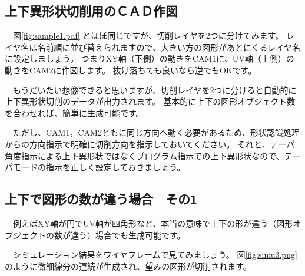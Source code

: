 

\subsection{上下異形状切削用のＣＡＤ作図}
　図\ref{fig:sample1.pdf} とほぼ同じですが、切削レイヤを2つに分けてみます。
レイヤ名は名前順に並び替えられますので、大きい方の図形があとにくるレイヤ名に設定しましょう。
つまりXY軸（下側）の動きをCAM1に、UV軸（上側）の動きをCAM2に作図します。
抜け落ちても良いなら逆でもOKです。


　もうだいたい想像できると思いますが、切削レイヤを2つに分けると自動的に上下異形状切削のデータが出力されます。
基本的に上下の図形オブジェクト数を合わせれば、簡単に生成可能です。


　ただし、CAM1，CAM2ともに同じ方向へ動く必要があるため、形状認識処理からの方向指示で明確に切削方向を指示しておいてください。
それと、テーパ角度指示による上下異形状ではなくプログラム指示での上下異形状なので、テーパモードの指示を正しく設定しておきましょう。

\subsection{上下で図形の数が違う場合　その1}
　例えばXY軸が円でUV軸が四角形など、本当の意味で上下の形が違う（図形オブジェクトの数が違う）場合でも生成可能です。


　シミュレーション結果をワイヤフレームで見てみましょう。
図\ref{fig:simu3.png} のように微細線分の連続が生成され、望みの図形が切削されます。


